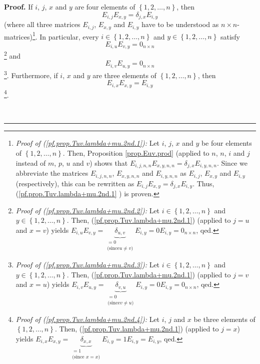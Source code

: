 \documentclass[numbers=enddot,12pt,final,onecolumn,notitlepage]{scrartcl}%
\theoremstyle{definition}
\newenvironment{proof}[1][Proof]{\noindent\textbf{#1.} }{\ \rule{0.5em}{0.5em}}
\begin{document}
\begin{proof}
If $i$, $j$, $x$ and $y$ are four elements of $\left\{  1,2,\ldots,n\right\}
$, then
\begin{equation}
E_{i,j}E_{x,y}=\delta_{j,x}E_{i,y} \label{pf.prop.Tuv.lambda+mu.2nd.1}%
\end{equation}
(where all three matrices $E_{i,j}$, $E_{x,y}$ and $E_{i,y}$ have to be
understood as $n\times n$-matrices)\footnote{\textit{Proof of
(\ref{pf.prop.Tuv.lambda+mu.2nd.1}):} Let $i$, $j$, $x$ and $y$ be four
elements of $\left\{  1,2,\ldots,n\right\}  $. Then, Proposition
\ref{prop.Euv.prod} (applied to $n$, $n$, $i$ and $j$ instead of $m$, $p$, $u$
and $v$) shows that $E_{i,j,n,n}E_{x,y,n,n}=\delta_{j,x}E_{i,y,n,n}$. Since we
abbreviate the matrices $E_{i,j,n,n}$, $E_{x,y,n,n}$ and $E_{i,y,n,n}$ as
$E_{i,j}$, $E_{x,y}$ and $E_{i,y}$ (respectively), this can be rewritten as
$E_{i,j}E_{x,y}=\delta_{j,x}E_{i,y}$. Thus, (\ref{pf.prop.Tuv.lambda+mu.2nd.1}%
) is proven.}. In particular, every $i\in\left\{  1,2,\ldots,n\right\}  $ and
$y\in\left\{  1,2,\ldots,n\right\}  $ satisfy%
\begin{equation}
E_{i,u}E_{v,y}=0_{n\times n} \label{pf.prop.Tuv.lambda+mu.2nd.2}%
\end{equation}
\footnote{\textit{Proof of (\ref{pf.prop.Tuv.lambda+mu.2nd.2}):} Let
$i\in\left\{  1,2,\ldots,n\right\}  $ and $y\in\left\{  1,2,\ldots,n\right\}
$. Then, (\ref{pf.prop.Tuv.lambda+mu.2nd.1}) (applied to $j=u$ and $x=v$)
yields $E_{i,u}E_{v,y}=\underbrace{\delta_{u,v}}_{\substack{=0\\\text{(since
}u\neq v\text{)}}}E_{i,y}=0E_{i,y}=0_{n\times n}$, qed.} and%
\begin{equation}
E_{i,v}E_{u,y}=0_{n\times n} \label{pf.prop.Tuv.lambda+mu.2nd.3}%
\end{equation}
\footnote{\textit{Proof of (\ref{pf.prop.Tuv.lambda+mu.2nd.3}):} Let
$i\in\left\{  1,2,\ldots,n\right\}  $ and $y\in\left\{  1,2,\ldots,n\right\}
$. Then, (\ref{pf.prop.Tuv.lambda+mu.2nd.1}) (applied to $j=v$ and $x=u$)
yields $E_{i,v}E_{u,y}=\underbrace{\delta_{v,u}}_{\substack{=0\\\text{(since
}v\neq u\text{)}}}E_{i,y}=0E_{i,y}=0_{n\times n}$, qed.}. Furthermore, if $i$,
$x$ and $y$ are three elements of $\left\{  1,2,\ldots,n\right\}  $, then%
\begin{equation}
E_{i,x}E_{x,y}=E_{i,y} \label{pf.prop.Tuv.lambda+mu.2nd.4}%
\end{equation}
\footnote{\textit{Proof of (\ref{pf.prop.Tuv.lambda+mu.2nd.4}):} Let $i$, $j$
and $x$ be three elements of $\left\{  1,2,\ldots,n\right\}  $. Then,
(\ref{pf.prop.Tuv.lambda+mu.2nd.1}) (applied to $j=x$) yields $E_{i,x}%
E_{x,y}=\underbrace{\delta_{x,x}}_{\substack{=1\\\text{(since }x=x\text{)}%
}}E_{i,y}=1E_{i,y}=E_{i,y}$, qed.}.


\end{proof}
\end{document}
